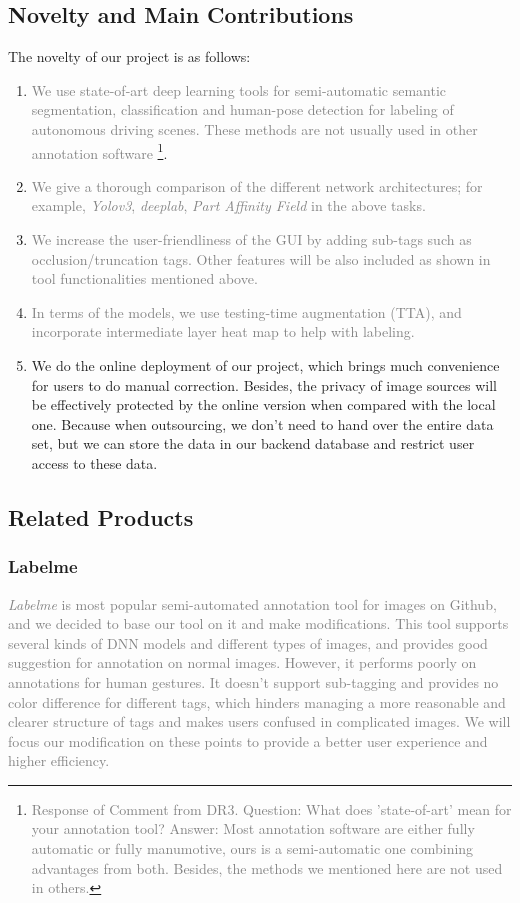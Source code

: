 \subsection{Novelty and Main Contributions}
The novelty of our project is as follows:
\begin{enumerate}
    \item \textcolor{gray}{We use state-of-art deep learning tools for
semi-automatic semantic segmentation, classification and human-pose detection
for labeling of autonomous driving scenes. These methods are not usually used
in other annotation software} \footnote{\textcolor{gray}{Response of Comment
from DR3. Question: What does 'state-of-art' mean for your annotation tool?
Answer: Most annotation software are either fully automatic or fully
manumotive, ours is a semi-automatic one combining advantages from both.
Besides, the methods we mentioned here are not used in others.}}.
    \item \textcolor{gray}{We give a thorough comparison of the different
network architectures; for example, \emph{Yolov3}, \emph{deeplab}, \emph{Part
Affinity Field} in the above tasks.}
    \item \textcolor{gray}{We increase the user-friendliness of the GUI by
adding sub-tags such as occlusion/truncation tags. Other features will be also
included as shown in tool functionalities mentioned above. }
    \item \textcolor{gray}{In terms of the models, we use testing-time
augmentation (TTA), and incorporate intermediate layer heat map to help with
labeling. }
    \item We do the online deployment of our project, which brings much
convenience for users to do manual correction. Besides, the privacy of image
sources will be effectively protected by the online version when compared with
the local one. Because when outsourcing, we don't need to hand over the entire
data set, but we can store the data in our backend database and restrict user
access to these data.

\end{enumerate}

\subsection{Related Products}

\subsubsection{Labelme}
\textcolor{gray}{\textit{Labelme}\cite{labelme} is most popular semi-automated
annotation tool for images on Github, and we decided to base our tool on it and
make modifications. This tool supports several kinds of DNN models and
different types of images, and provides good suggestion for annotation on
normal images. However, it performs poorly on annotations for human gestures.
It doesn't support sub-tagging and provides no color difference for different
tags, which hinders managing a more reasonable and clearer structure of tags
and makes users confused in complicated images. We will focus our modification
on these points to provide a better user experience and higher efficiency. }


